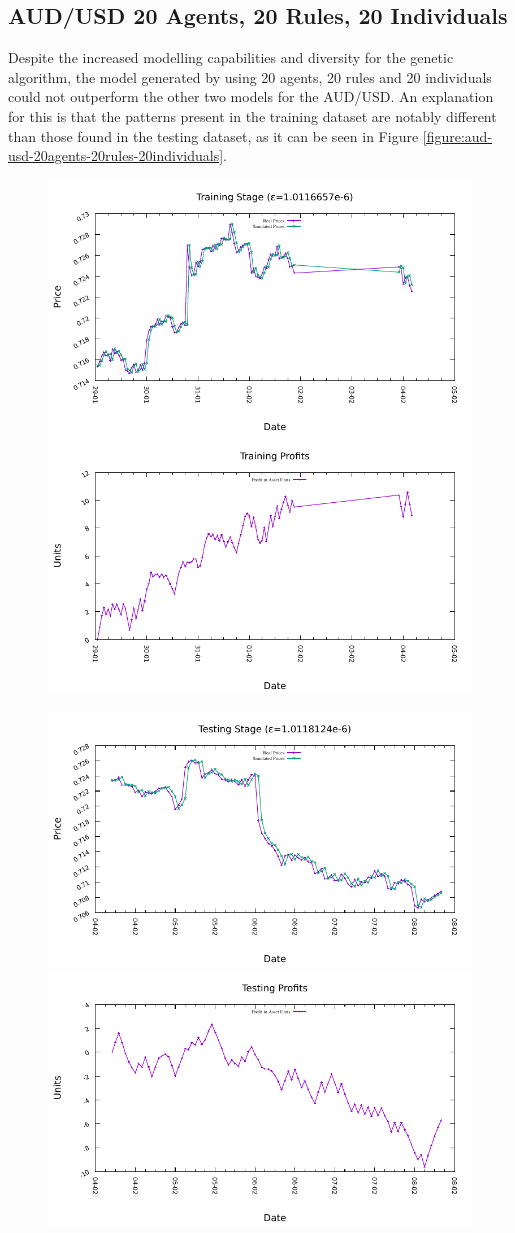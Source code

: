 \newpage

\subsection{AUD/USD 20 Agents, 20 Rules, 20 Individuals}
\label{results:forecast-aud-usd-20agents-20rules-20individuals}

Despite the increased modelling capabilities and diversity for the genetic
algorithm, the model generated by using 20 agents, 20 rules and 20 individuals
could not outperform the other two models for the AUD/USD. An explanation for
this is that the patterns present in the training dataset are notably different
than those found in the testing dataset, as it can be seen in Figure
\ref{figure:aud-usd-20agents-20rules-20individuals}.

\begin{figure}[htp]
  \centering

  \includegraphics[width=.45\textwidth]{img/plots/aud_usd_h1-20agents-20rules-20ind-100gen_training_fit.pdf}\quad
  \includegraphics[width=.45\textwidth]{img/plots/aud_usd_h1-20agents-20rules-20ind-100gen_training_profits.pdf}

  \medskip

  \includegraphics[width=.45\textwidth]{img/plots/aud_usd_h1-20agents-20rules-20ind-100gen_testing_fit.pdf}\quad
  \includegraphics[width=.45\textwidth]{img/plots/aud_usd_h1-20agents-20rules-20ind-100gen_testing_profits.pdf}


\end{figure}
